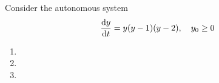 Consider the autonomous system
$$\dv{y}{t} = y(y-1)(y-2), \quad y_0 \geq 0$$

\begin{enumerate}[label=(\alph*)]
    \item 
    \item 
    \item 
\end{enumerate}